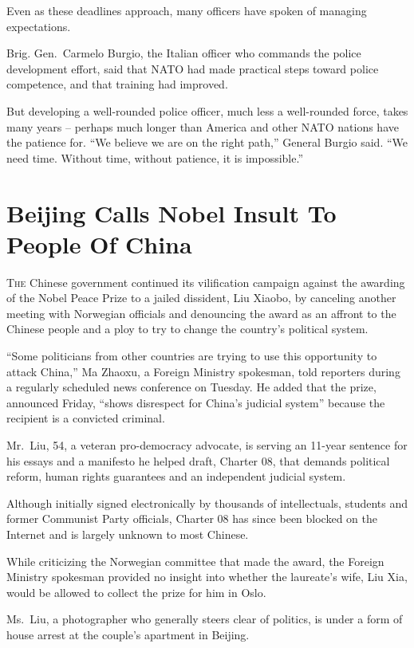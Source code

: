 ﻿\documentclass[12pt]{article}
\begin{document}
Even as these deadlines approach, many officers have spoken of managing expectations.

Brig. Gen.~Carmelo Burgio, the Italian officer who commands the police development effort, said that
NATO had made practical steps toward police competence, and that training had improved.

But developing a well-rounded police officer, much less a well-rounded force, takes many years --
perhaps much longer than America and other NATO nations have the patience for. ``We believe we are
on the right path,'' General Burgio said. ``We need time. Without time, without patience, it is
impossible.''

\section{Beijing Calls Nobel Insult To People Of China}

\lettrine{T}{he} Chinese government continued its vilification campaign
against the awarding of the Nobel Peace Prize to a jailed dissident, Liu Xiaobo, by canceling
another meeting with Norwegian officials and denouncing the award as an affront to the Chinese
people and a ploy to try to change the country's political system.

``Some politicians from other countries are trying to use this opportunity to attack China,'' Ma
Zhaoxu, a Foreign Ministry spokesman, told reporters during a regularly scheduled news conference on
Tuesday. He added that the prize, announced Friday, ``shows disrespect for China's judicial system''
because the recipient is a convicted criminal.

Mr.~Liu, 54, a veteran pro-democracy advocate, is serving an 11-year sentence for his essays and a
manifesto he helped draft, Charter 08, that demands political reform, human rights guarantees and an
independent judicial system.

Although initially signed electronically by thousands of intellectuals, students and former
Communist Party officials, Charter 08 has since been blocked on the Internet and is largely unknown
to most Chinese.

While criticizing the Norwegian committee that made the award, the Foreign Ministry spokesman
provided no insight into whether the laureate's wife, Liu Xia, would be allowed to collect the prize
for him in Oslo.

Ms.~Liu, a photographer who generally steers clear of politics, is under a form of house arrest at
the couple's apartment in Beijing.
\end{document}
